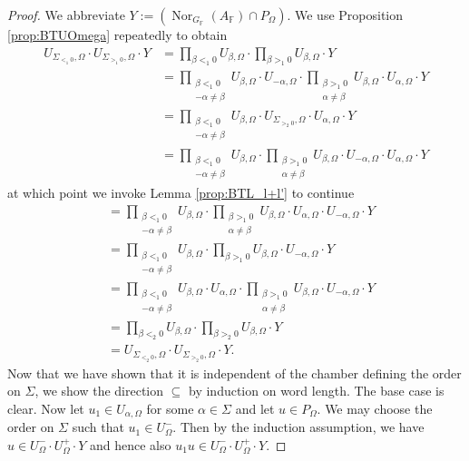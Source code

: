 \documentclass[12pt]{amsart}
\newcommand{\F}{\mathbb{F} }
\numberwithin{equation}{section}
\theoremstyle{remark} %
\begin{document}
\begin{proof}
			We abbreviate $Y := (\operatorname{Nor}_{G_\F}(A_\F)\cap P_{\Omega})$. We use Proposition \ref{prop:BTUOmega} repeatedly to obtain 
			\begin{align*}
				U_{\Sigma_{<_1 0},\Omega} \cdot U_{\Sigma_{>_1 0},\Omega} \cdot Y 
				&= \prod_{\beta <_1 0} U_{\beta, \Omega} \cdot \prod_{\beta >_1 0} U_{\beta, \Omega} \cdot Y \\
				&= \prod_{\substack{\beta <_1 0\\ -\alpha \neq \beta}} U_{\beta, \Omega} \cdot  U_{-\alpha, \Omega} \cdot \prod_{\substack{\beta >_1 0\\ \alpha \neq \beta}} U_{\beta, \Omega}  \cdot U_{\alpha, \Omega} \cdot Y \\
				&= \prod_{\substack{\beta <_1 0\\ -\alpha \neq \beta}} U_{\beta, \Omega} \cdot U_{\Sigma_{>_2 0},\Omega}  \cdot U_{\alpha, \Omega} \cdot Y \\
				&= \prod_{\substack{\beta <_1 0\\ -\alpha \neq \beta}} U_{\beta, \Omega} \cdot  \prod_{\substack{\beta >_1 0\\ \alpha \neq \beta}} U_{\beta, \Omega} \cdot U_{-\alpha, \Omega} \cdot U_{\alpha, \Omega} \cdot Y 
			\end{align*}
			at which point we invoke Lemma \ref{prop:BTL_l+l'} to continue
			\begin{align*}
				&= \prod_{\substack{\beta <_1 0\\ -\alpha \neq \beta}} U_{\beta, \Omega} \cdot  \prod_{\substack{\beta >_1 0\\ \alpha \neq \beta}} U_{\beta, \Omega} \cdot U_{\alpha, \Omega} \cdot U_{-\alpha, \Omega} \cdot Y \\
				&= \prod_{\substack{\beta <_1 0\\ -\alpha \neq \beta}} U_{\beta, \Omega} \cdot  \prod_{\beta >_1 0} U_{\beta, \Omega} \cdot U_{-\alpha, \Omega} \cdot Y \\
				&= \prod_{\substack{\beta <_1 0\\ -\alpha \neq \beta}} U_{\beta, \Omega} \cdot  U_{\alpha, \Omega}  \cdot \prod_{\substack{\beta >_1 0\\ \alpha \neq \beta}} U_{\beta, \Omega} \cdot  U_{-\alpha, \Omega} \cdot Y \\
				&=  \prod_{\beta <_2 0} U_{\beta, \Omega}  \cdot \prod_{\beta >_2 0} U_{\beta, \Omega} \cdot Y \\
				&= U_{\Sigma_{<_2 0}, \Omega} \cdot U_{\Sigma_{>_2 0},\Omega} \cdot Y.
			\end{align*}
			Now that we have shown that it is independent of the chamber defining the order on $\Sigma$, we show the direction $\subseteq$ by induction on word length. The base case is clear. Now let $u_1 \in U_{\alpha, \Omega}$ for some $\alpha \in \Sigma$ and let $u \in P_\Omega$. We may choose the order on $\Sigma$ such that $u_1 \in U_\Omega^-$. Then by the induction assumption, we have $u \in U_\Omega^- \cdot U_\Omega^+ \cdot Y$ and hence also $u_1u \in U_\Omega^- \cdot U_\Omega^+ \cdot Y$.
			

\end{proof}
\end{document}
